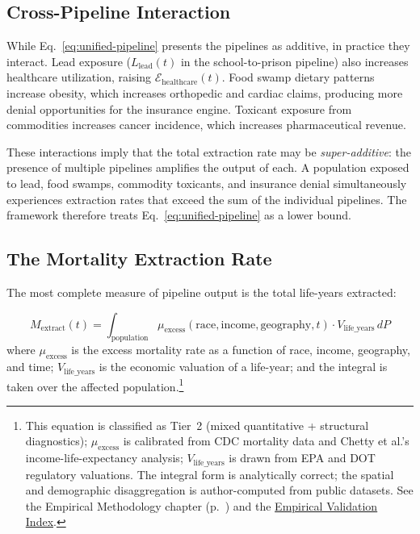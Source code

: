 \subsection{Cross-Pipeline Interaction}

While Eq.~\ref{eq:unified-pipeline} presents the pipelines as additive, in practice they interact. Lead exposure ($L_{\text{lead}}(t)$ in the school-to-prison pipeline) also increases healthcare utilization, raising $\mathcal{E}_{\text{healthcare}}(t)$. Food swamp dietary patterns increase obesity, which increases orthopedic and cardiac claims, producing more denial opportunities for the insurance engine. Toxicant exposure from commodities increases cancer incidence, which increases pharmaceutical revenue.

These interactions imply that the total extraction rate may be \textit{super-additive}: the presence of multiple pipelines amplifies the output of each. A population exposed to lead, food swamps, commodity toxicants, and insurance denial simultaneously experiences extraction rates that exceed the sum of the individual pipelines. The framework therefore treats Eq.~\ref{eq:unified-pipeline} as a lower bound.

\subsection{The Mortality Extraction Rate}

The most complete measure of pipeline output is the total life-years extracted:

\begin{equation}\label{eq:mortality-extraction}
M_{\text{extract}}(t) = \int_{\text{population}} \mu_{\text{excess}}(\text{race}, \text{income}, \text{geography}, t) \cdot V_{\text{life\_years}} \, dP
\end{equation}
where $\mu_{\text{excess}}$ is the excess mortality rate as a function of race, income, geography, and time; $V_{\text{life\_years}}$ is the economic valuation of a life-year; and the integral is taken over the affected population.\footnote{This equation is classified as Tier~2 (mixed quantitative + structural diagnostics); $\mu_{\text{excess}}$ is calibrated from CDC mortality data and Chetty et al.'s income-life-expectancy analysis; $V_{\text{life\_years}}$ is drawn from EPA and DOT regulatory valuations. The integral form is analytically correct; the spatial and demographic disaggregation is author-computed from public datasets. See the Empirical Methodology chapter (p.~\pageref{ch:empirical_methodology}) and the \hyperref[app:empirical_index]{Empirical Validation Index}.}

